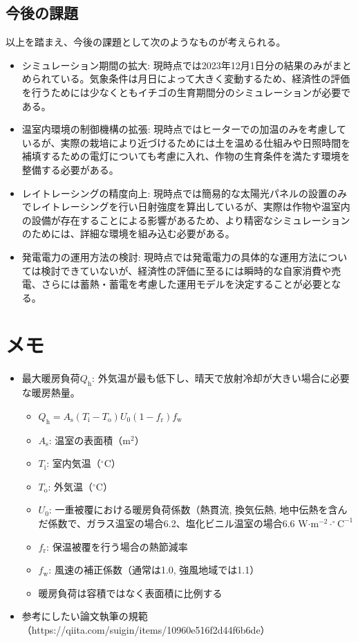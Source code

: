 \documentclass[uplatex,dvipdfmx,nomag,a4paper,oneside,onecolumn,12pt]{bxjsreport} %
\begin{document}
\section{今後の課題}
以上を踏まえ、今後の課題として次のようなものが考えられる。
\begin{itemize}
    \item シミュレーション期間の拡大: 現時点では2023年12月1日分の結果のみがまとめられている。気象条件は月日によって大きく変動するため、経済性の評価を行うためには少なくともイチゴの生育期間分のシミュレーションが必要である。
    \item 温室内環境の制御機構の拡張: 現時点ではヒーターでの加温のみを考慮しているが、実際の栽培により近づけるためには土を温める仕組みや日照時間を補填するための電灯についても考慮に入れ、作物の生育条件を満たす環境を整備する必要がある。
    \item レイトレーシングの精度向上: 現時点では簡易的な太陽光パネルの設置のみでレイトレーシングを行い日射強度を算出しているが、実際は作物や温室内の設備が存在することによる影響があるため、より精密なシミュレーションのためには、詳細な環境を組み込む必要がある。
    \item 発電電力の運用方法の検討: 現時点では発電電力の具体的な運用方法については検討できていないが、経済性の評価に至るには瞬時的な自家消費や売電、さらには蓄熱・蓄電を考慮した運用モデルを決定することが必要となる。
\end{itemize}

\chapter{メモ}
\begin{itemize}
    \item 最大暖房負荷\(Q_\text{h}\): 外気温が最も低下し、晴天で放射冷却が大きい場合に必要な暖房熱量\cite{Samejima2021}。
    \begin{itemize}
        \item \(Q_\text{h} = A_\text{s} (T_\text{i} - T_\text{o}) U_\text{0} (1 - f_\text{r}) f_\text{w}\)
        \item \(A_\text{s}\): 温室の表面積（m\(^2\)）
        \item \(T_\text{i}\): 室内気温（\(^\circ \text{C}\)）
        \item \(T_\text{o}\): 外気温（\(^\circ \text{C}\)）
        \item \(U_\text{0}\): 一重被覆における暖房負荷係数（熱貫流, 換気伝熱, 地中伝熱を含んだ係数で、ガラス温室の場合6.2、塩化ビニル温室の場合6.6 W\(\cdot\)m\(^{-2}\cdot ^\circ \text{C}^{-1}\)
        \item \(f_\text{r}\): 保温被覆を行う場合の熱節減率
        \item \(f_\text{w}\): 風速の補正係数（通常は1.0,  強風地域では1.1）
        \item 暖房負荷は容積ではなく表面積に比例する
    \end{itemize}
    \item 参考にしたい論文執筆の規範（https://qiita.com/suigin/items/10960e516f2d44f6b6de）
\end{itemize}
\end{document}
